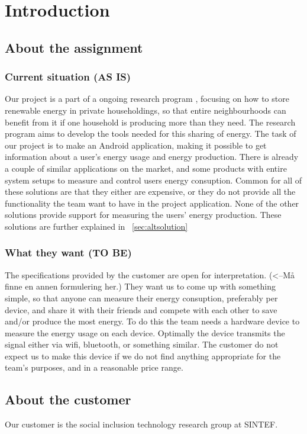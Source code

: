 \chapter{Introduction}

\section{About the assignment}
\subsection{Current situation (AS IS)}
Our project is a part of a ongoing research program \cite{cossmic}, focusing on how to store renewable energy in private householdings, so that entire neighbourhoods can benefit from it if one household is producing more than they need. The research program aims to develop the tools needed for this sharing of energy. The task of our project is to make an Android application, making it possible to get information about a user's energy usage and energy production. There is already a couple of similar applications on the market, and some products with entire system setups to measure and control users energy consuption. Common for all of these solutions are that they either are expensive, or they do not provide all the functionality the team want to have in the project application. None of the other solutions provide support for measuring the users' energy production. These solutions are further explained in ~\ref{sec:altsolution}

\subsection{What they want (TO BE)}
The specifications provided by the customer are open for interpretation. (<--Må finne en annen formulering her.) They want us to come up with something simple, so that anyone can measure their energy consuption, preferably per device, and share it with their friends and compete with each other to save and/or produce the most energy. To do this the team needs a hardware device to measure the energy usage on each device. Optimally the device transmits the signal either via wifi, bluetooth, or something similar. The customer do not expect us to make this device if we do not find anything appropriate for the team's purposes, and in a reasonable price range.

\section{About the customer}

Our customer is the social inclusion technology research group at SINTEF. \cite{sintef}








 


